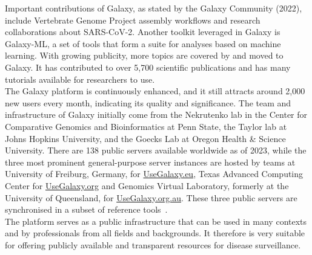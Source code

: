 Important contributions of Galaxy, as stated by the Galaxy Community (2022), include Vertebrate Genome Project assembly workflows and research collaborations about \ac{SARS-CoV-2}. Another toolkit leveraged in Galaxy is Galaxy-ML, a set of tools that form a suite for analyses based on machine learning. With growing publicity, more topics are covered by and moved to Galaxy. It has contributed to over 5,700 scientific publications and has many tutorials available for researchers to use. \\
The Galaxy platform is continuously enhanced, and it still attracts around 2,000 new users every month, indicating its quality and significance. The team and infrastructure of Galaxy initially come from the Nekrutenko lab in the Center for Comparative Genomics and Bioinformatics at Penn State, the Taylor lab at Johns Hopkins University, and the Goecks Lab at Oregon Health \& Science University. There are 138 public servers available worldwide as of 2023, while the three most prominent general-purpose server instances are hosted by teams at University of Freiburg, Germany, for \href{https://usegalaxy.eu/}{UseGalaxy.eu}, Texas Advanced Computing Center for \href{https://usegalaxy.org/}{UseGalaxy.org} and Genomics Virtual Laboratory, formerly at the University of Queensland, for \href{https://usegalaxy.org.au/}{UseGalaxy.org.au}. These three public servers are synchronised in a subset of reference tools~\cite{10.1093/nar/gkac247}. \\
The platform serves as a public infrastructure that can be used in many contexts and by professionals from all fields and backgrounds. It therefore is very suitable for offering publicly available and transparent resources for disease surveillance.

